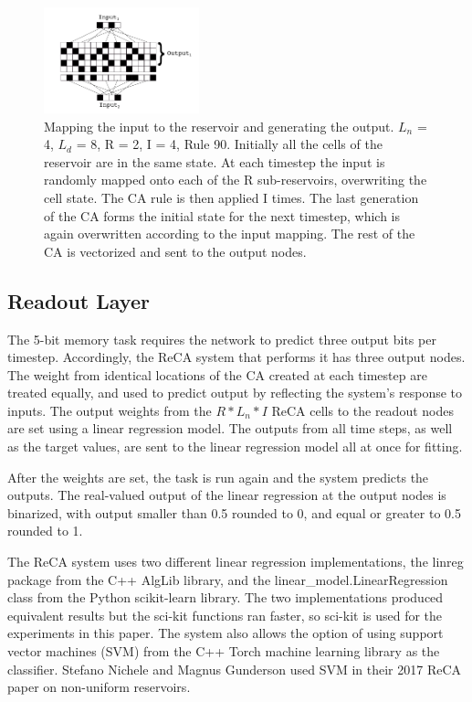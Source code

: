\documentclass{article}
\begin{document}
\begin{multicols}{2}
\begin{figure}[H]
        \centering
            \includegraphics[width=0.4\textwidth]{Architecture.png}
    \caption{Mapping the input to the reservoir and generating the output.  
        $L_{n}$ = 4, $L_{d}$ = 8, R = 2, I = 4, Rule 90. Initially all the 
            cells of the reservoir are in the same state. At each timestep the 
            input is randomly mapped onto each of the R sub-reservoirs, 
                  overwriting the cell state. The CA rule is then applied I 
                      times. The last generation of the CA forms the initial 
                      state for the next timestep, which is again overwritten 
                      according to the input mapping. The rest of the CA is 
                      vectorized and sent to the output nodes. } 
        
            \label{architecture}
            \end{figure}

\subsection{Readout Layer}
The 5-bit memory task requires the network to predict three output bits per 
timestep.  Accordingly, the ReCA system that performs it has three output 
nodes.  The weight from identical locations of the CA created at each timestep 
are treated equally, and used to predict output by reflecting the system's 
response to inputs. The output weights from the $R * L_{n} * I$ ReCA cells to 
the readout nodes are set using a linear regression model. The outputs from all 
time steps, as well as the target values, are sent to the linear regression 
model all at once for fitting.  \par
After the weights are set, the task is run again and the system predicts the 
outputs. The real-valued output of the linear regression at the output nodes is 
binarized, with output smaller than 0.5 rounded to 0, and equal or greater to 
0.5 rounded to 1. \par The ReCA system uses two different linear regression 
implementations, the linreg package from the C++ AlgLib library, and the 
linear\_model.LinearRegression class from the Python scikit-learn library.  The 
two implementations produced equivalent results but the sci-kit functions ran 
faster, so sci-kit is used for the experiments in this paper. The system also 
allows the option of  using support vector machines (SVM) from the C++ Torch 
machine learning library as the classifier.  Stefano Nichele and Magnus 
Gunderson used SVM in their 2017 ReCA paper on non-uniform 
reservoirs\cite{nichele2017reservoir}.


\end{multicols}
\end{document}

